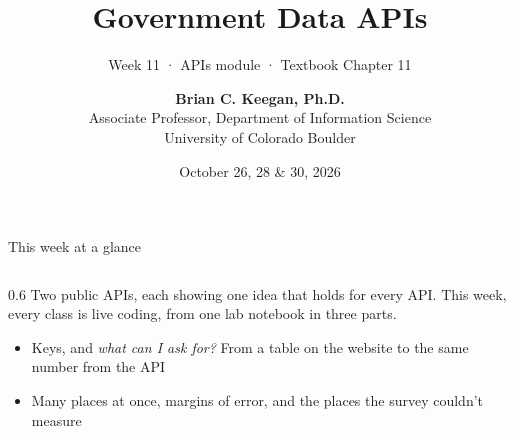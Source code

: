 \documentclass[9pt,aspectratio=169]{beamer}
\title[Week 11 · Government APIs]{{\Huge Government Data APIs}}
\subtitle{Week 11 · APIs module · Textbook Chapter 11}
\author[Keegan]{\textbf{Brian C. Keegan, Ph.D.} \\ Associate Professor, Department of Information Science \\ University of Colorado Boulder}
\date{October 26, 28 \& 30, 2026}
\begin{document}
\maketitle

\begin{frame}{This week at a glance}
    \begin{columns}[T]
        \begin{column}{0.6\textwidth}
            Two public APIs, each showing one idea that holds for every API. This week, every class is live coding, from one lab notebook in three parts.

            \bigskip

            \begin{itemize}\small
                \item Keys, and \textit{what can I ask for?} From a table on the website to the same number from the API
            \end{itemize}

            \medskip

            \begin{itemize}\small
                \item Many places at once, margins of error, and the places the survey couldn't measure
            \end{itemize}

            \medskip


\end{column}
\end{columns}
\end{frame}
\end{document}

